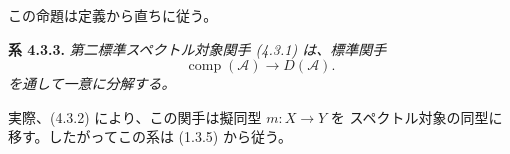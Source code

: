 \noindent この命題は定義から直ちに従う。

\medskip\noindent\textbf{系 4.3.3.}\quad
\textit{第二標準スペクトル対象関手 (4.3.1) は、標準関手}
\[
\operatorname{comp}(\mathcal A)\longrightarrow D(\mathcal A).
\]
\noindent\textit{を通して一意に分解する。}

実際、(4.3.2) により、この関手は擬同型 $m\colon X\longrightarrow Y$ を
スペクトル対象の同型に移す。したがってこの系は (1.3.5) から従う。
\endgroup
